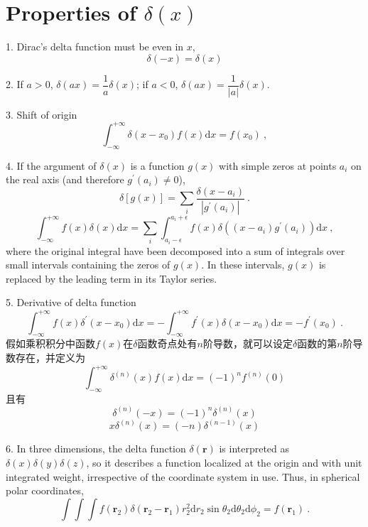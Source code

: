 \documentclass[12pt,a4paper]{article}
\renewcommand{\vec}[1]{\boldsymbol{#1}}
\newcommand{\dif}{\mathrm{d}}
\begin{document}
\section{Properties of $\delta(x)$}
1. Dirac's delta function must be even in $x$,
\begin{equation}
\delta(-x) = \delta(x)
\end{equation}

2. If $a > 0$, $\delta(ax) = \dfrac{1}{a} \delta(x)$; if $a < 0$, $\delta(ax) =  \dfrac{1}{|a|} \delta(x)$.

3. Shift of origin
\begin{equation}
\int^{+\infty}_{-\infty} \delta(x-x_0) f(x) \dif x = f(x_0) ~,
\end{equation}

4. If the argument of $\delta(x)$ is a function $g(x)$ with simple zeros at points $a_i$ on the real axis (and therefore $g^\prime(a_i ) \neq 0$),
\begin{equation}
\delta[g(x)] = \sum_i \frac{\delta(x -a_i)}{|g^\prime(a_i)|} ~.
\end{equation}
\begin{equation}
\int^{+\infty}_{-\infty} f(x) \delta(x) \dif x = \sum_i \int_{a_i -\epsilon}^{a_i +\epsilon} f(x) \delta((x -a_i) g^\prime(a_i) ) \dif x ~,
\end{equation}
where the original integral have been decomposed into a sum of integrals over small intervals containing the zeros of $g(x)$. In these intervals, $g(x)$ is replaced by the leading term in its Taylor series. 

5. Derivative of delta function
\begin{equation}
\int^{+\infty}_{-\infty} f(x) \delta^\prime(x -x_0) \dif x = - \int^{+\infty}_{-\infty} f^\prime(x) \delta(x-x_0) \dif x = -f^\prime(x_0) ~.
\end{equation}
假如乘积积分中函数$f(x)$在$\delta$函数奇点处有$n$阶导数，就可以设定$\delta$函数的第$n$阶导数存在，并定义为
\begin{equation}
\int_{-\infty}^{+\infty} \delta^{(n)} (x) f(x) \dif x = (-1)^n f^{(n)}(0)
\end{equation}
且有
\begin{equation}
\delta^{(n)} (-x) = (-1)^n \delta^{(n)}(x)
\end{equation}
\begin{equation}
x\delta^{(n)} (x) = (-n) \delta^{(n-1)}(x)
\end{equation}

6. In three dimensions, the delta function $\delta(\vec{r})$ is interpreted as $\delta(x) \delta(y) \delta(z)$, so it describes a function localized at the origin and with unit integrated weight, irrespective of the coordinate system in use. Thus, in spherical polar coordinates,
\begin{equation}
\int\int\int f(\vec{r}_2) \delta(\vec{r}_2 -\vec{r}_1) r_2^2 \dif r_2 \sin \theta_2 \dif \theta_2 \dif \phi_2 = f(\vec{r}_1) ~.
\end{equation}
\end{document}
